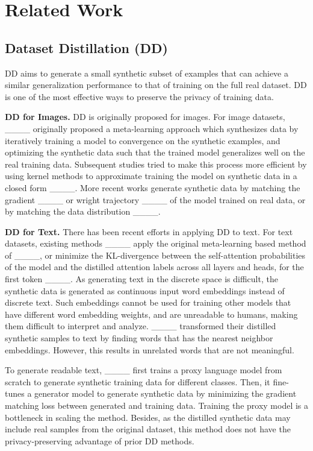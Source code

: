 \section{Related Work}
\subsection{Dataset Distillation (DD)}
DD aims to generate a small synthetic subset of examples that can achieve a similar generalization performance to that of training on the full real dataset. DD is one of the most effective ways to preserve the privacy of training data.
%

\textbf{DD for Images.} DD is originally proposed for images. For image datasets, ____ originally proposed a meta-learning approach which synthesizes data by iteratively training a model to convergence on the synthetic examples, and optimizing the synthetic data such that the trained model generalizes well on the real training data. 
Subsequent studies tried to make this process more efficient by using kernel methods %
to approximate training the model on synthetic data in a closed form ____. 
More recent works generate synthetic data by matching the gradient ____ or wright trajectory ____ of the model trained on real data, or by matching the data distribution ____.

\textbf{DD for Text. } 
There has been recent efforts in applying DD to text.
For text datasets, existing methods ____ apply the original meta-learning based method of ____, or minimize the KL-divergence between the self-attention probabilities of the model and the distilled attention labels across all layers and heads, for the first token ____. 
%
%
As generating text in the discrete space is difficult, the synthetic data is generated as continuous input word embeddings instead of discrete text.  
%
%
%
%
Such embeddings cannot be used for training other models that have different word embedding weights, and
%
%
%
are unreadable to humans, making them difficult to interpret and analyze. %
____ transformed their distilled synthetic samples to text by finding words that has the nearest neighbor embeddings. However, this results in unrelated words that are not meaningful.
%




To generate readable text, ____ 
%
first trains a proxy language model from scratch to generate synthetic training %
data for different classes. Then, 
%
it fine-tunes a generator model to generate %
synthetic data by minimizing the gradient matching loss between generated and training data.
%
%
Training the proxy model is a bottleneck in scaling the method. 
%
Besides, as the distilled synthetic data may include real samples from the original dataset, %
%
this method does not have the privacy-preserving advantage of prior DD methods.

